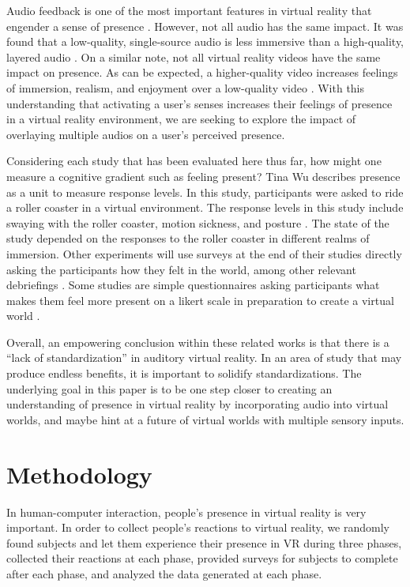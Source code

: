 \documentclass[manuscript,screen,review]{acmart}
\begin{document}
Audio feedback is one of the most important features in virtual reality that engender a sense of presence \cite{JELFS}. However, not all audio has the same impact. It was found that a low-quality, single-source audio is less immersive than a high-quality, layered audio \cite{BRINKMAN}. On a similar note, not all virtual reality videos have the same impact on presence. As can be expected, a higher-quality video increases feelings of immersion, realism, and enjoyment over a low-quality video \cite{LEVEE}. With this understanding that activating a user’s senses increases their feelings of presence in a virtual reality environment, we are seeking to explore the impact of overlaying multiple audios on a user’s perceived presence. 

Considering each study that has been evaluated here thus far, how might one measure a cognitive gradient such as feeling present? Tina Wu describes presence as a unit to measure response levels. In this study, participants were asked to ride a roller coaster in a virtual environment. The response levels in this study include swaying with the roller coaster, motion sickness, and posture \cite{Wu}. The state of the study depended on the responses to the roller coaster in different realms of immersion. Other experiments will use surveys at the end of their studies directly asking the participants how they felt in the world, among other relevant debriefings \cite{SCHUEMIE}. Some studies are simple questionnaires asking participants what makes them feel more present on a likert scale in preparation to create a virtual world \cite{WITMER}. 

Overall, an empowering conclusion within these related works is that there is a “lack of standardization” \cite{BOSMAN} in auditory virtual reality. In an area of study that may produce endless benefits, it is important to solidify standardizations. The underlying goal in this paper is to be one step closer to creating an understanding of presence in virtual reality by incorporating audio into virtual worlds, and maybe hint at a future of virtual worlds with multiple sensory inputs.



\section{Methodology}
In human-computer interaction, people's presence in virtual reality is very important. In order to collect people's reactions to virtual reality, we randomly found subjects and let them experience their presence in VR during three phases, collected their reactions at each phase, provided surveys for subjects to complete after each phase, and analyzed the data generated at each phase. 
\end{document}
